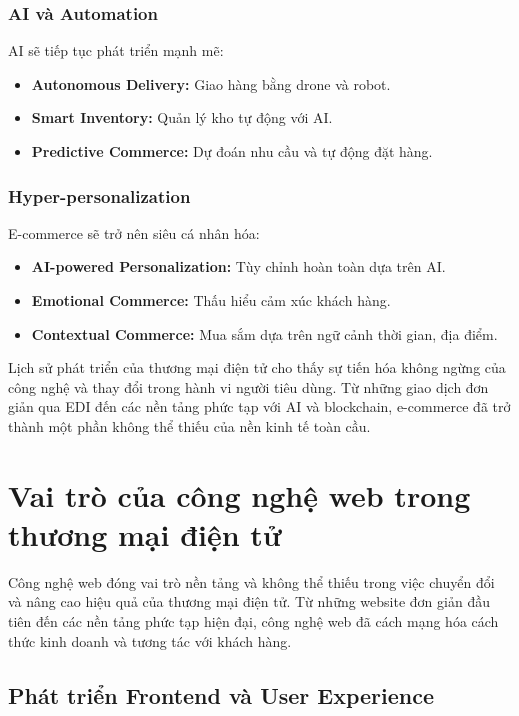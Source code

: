 \documentclass[a4paper,12pt]{report}
\begin{document}
\subsubsection{AI và Automation}
AI sẽ tiếp tục phát triển mạnh mẽ:
\begin{itemize}
    \item \textbf{Autonomous Delivery:} Giao hàng bằng drone và robot.
    \item \textbf{Smart Inventory:} Quản lý kho tự động với AI.
    \item \textbf{Predictive Commerce:} Dự đoán nhu cầu và tự động đặt hàng.
\end{itemize}

\subsubsection{Hyper-personalization}
E-commerce sẽ trở nên siêu cá nhân hóa:
\begin{itemize}
    \item \textbf{AI-powered Personalization:} Tùy chỉnh hoàn toàn dựa trên AI.
    \item \textbf{Emotional Commerce:} Thấu hiểu cảm xúc khách hàng.
    \item \textbf{Contextual Commerce:} Mua sắm dựa trên ngữ cảnh thời gian, địa điểm.
\end{itemize}

Lịch sử phát triển của thương mại điện tử cho thấy sự tiến hóa không ngừng của công nghệ và thay đổi trong hành vi người tiêu dùng. Từ những giao dịch đơn giản qua EDI đến các nền tảng phức tạp với AI và blockchain, e-commerce đã trở thành một phần không thể thiếu của nền kinh tế toàn cầu.

\section{Vai trò của công nghệ web trong thương mại điện tử}

Công nghệ web đóng vai trò nền tảng và không thể thiếu trong việc chuyển đổi và nâng cao hiệu quả của thương mại điện tử. Từ những website đơn giản đầu tiên đến các nền tảng phức tạp hiện đại, công nghệ web đã cách mạng hóa cách thức kinh doanh và tương tác với khách hàng.

\subsection{Phát triển Frontend và User Experience}
\end{document}
